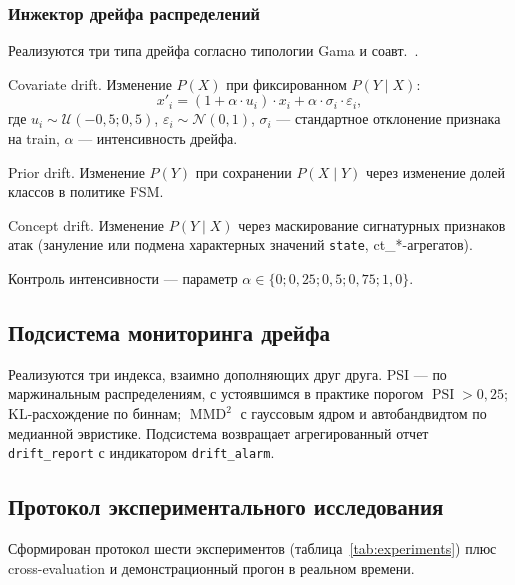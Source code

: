 \subsubsection{Инжектор дрейфа распределений}

Реализуются три типа дрейфа согласно типологии Gama и
соавт.~\cite{gama2014drift}.

Covariate drift. Изменение $P(X)$ при фиксированном $P(Y \mid X)$:
\[
x'_i = (1 + \alpha \cdot u_i) \cdot x_i + \alpha \cdot \sigma_i \cdot \varepsilon_i,
\]
где $u_i \sim \mathcal{U}(-0{,}5; 0{,}5)$, $\varepsilon_i \sim
\mathcal{N}(0, 1)$, $\sigma_i$ --- стандартное отклонение признака
на train, $\alpha$ --- интенсивность дрейфа.

Prior drift. Изменение $P(Y)$ при сохранении $P(X \mid Y)$ через
изменение долей классов в политике FSM.

Concept drift. Изменение $P(Y \mid X)$ через маскирование
сигнатурных признаков атак (зануление или подмена характерных
значений \texttt{state}, ct\_*-агрегатов).

Контроль интенсивности --- параметр $\alpha \in \{0; 0{,}25; 0{,}5;
0{,}75; 1{,}0\}$.

\subsection{Подсистема мониторинга дрейфа}

Реализуются три индекса, взаимно дополняющих друг друга. PSI ---
по маржинальным распределениям, с устоявшимся в практике порогом
$\operatorname{PSI} > 0{,}25$; KL-расхождение по биннам;
$\operatorname{MMD}^2$ с гауссовым ядром и автобандвидтом по
медианной эвристике. Подсистема возвращает агрегированный отчет
\texttt{drift\_report} с индикатором \texttt{drift\_alarm}.

\subsection{Протокол экспериментального исследования}

Сформирован протокол шести экспериментов (таблица~\ref{tab:experiments})
плюс cross-evaluation и демонстрационный прогон в реальном
времени.

